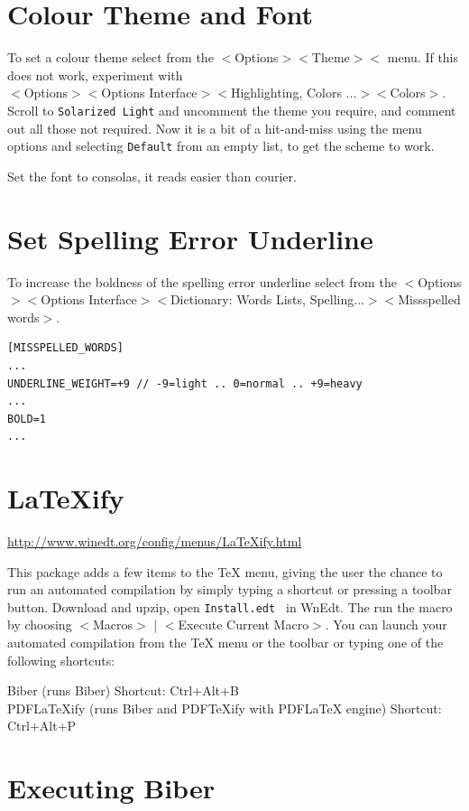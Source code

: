 \section{Colour Theme and Font}

To set a colour theme select from the
$<$Options$>$$<$Theme$>$$<$ menu.  If this does not work, experiment with \\
$<$Options$>$$<$Options Interface$>$$<$Highlighting, Colors ...$>$$<$Colors$>$. Scroll to \lstinline{Solarized Light} and uncomment the theme you require, and comment out all those not required.  Now it is a bit of a hit-and-miss using the menu options and selecting \lstinline{Default} from an empty list, to get the scheme to work.


Set the font to consolas, it reads easier than courier.

\section{Set Spelling Error Underline}

To increase the boldness of the spelling error underline select from the
$<$Options$>$$<$Options Interface$>$$<$Dictionary: Words Lists, Spelling...$>$$<$Missspelled words$>$. 


\begin{lstlisting}
[MISSPELLED_WORDS]
...
UNDERLINE_WEIGHT=+9 // -9=light .. 0=normal .. +9=heavy
...
BOLD=1
...
\end{lstlisting}


\section{LaTeXify}

\url{http://www.winedt.org/config/menus/LaTeXify.html}

This package adds a few items to the TeX menu, giving the user the chance to run an automated compilation by simply typing a shortcut or pressing a toolbar button.  Download and upzip, open \lstinline{Install.edt } in WnEdt. The run the macro  by choosing $<$Macros$>$ | $<$Execute Current Macro$>$.  You can launch your automated compilation from the TeX menu or the toolbar or typing one of the following shortcuts:

Biber (runs Biber) Shortcut: Ctrl+Alt+B\\
PDFLaTeXify (runs Biber and PDFTeXify with PDFLaTeX engine) Shortcut: Ctrl+Alt+P

\section{Executing Biber}

